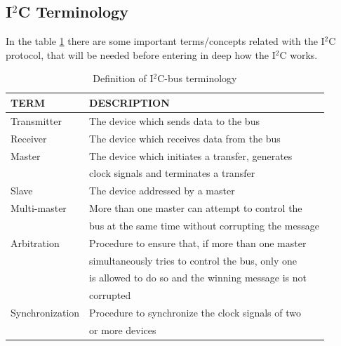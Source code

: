 \subsection{\texorpdfstring{I$^2$C Terminology}{I2C Terminology}}
\label{chap:Back_I2C_Terminology}

In the table \ref{tab:i2c_terminology} there are some important terms/concepts related with the 
I$^2$C protocol, that will be needed before entering in deep how the I$^2$C works.

\begin{table}[H]
    \centering
    \begin{tabular}{|l | l|}
        \hline
        TERM            & DESCRIPTION \\        
        \hline
        Transmitter     & The device which sends data to the bus \\
        \hline
        Receiver        & The device which receives data from the bus\\
        \hline
        Master          & The device which initiates a transfer, generates\\ 
                        & clock signals and terminates a transfer \\
        \hline
        Slave           & The device addressed by a master \\
        \hline
        Multi-master    & More than one master can attempt to control the \\
                        &  bus at the same time without corrupting the message \\
        \hline
        Arbitration     & Procedure to ensure that, if more than one master \\
                        & simultaneously tries to control the bus, only one \\ 
                        & is allowed to do so and the winning message is not \\
                        & corrupted \\
        \hline
        Synchronization & Procedure to synchronize the clock signals of two \\
                        & or more devices \\
        \hline
    \end{tabular}

    \caption
        {
            Definition of I$^2$C-bus terminology \cite{I2CSpec2000}
        }
    \label{tab:i2c_terminology}
\end{table}